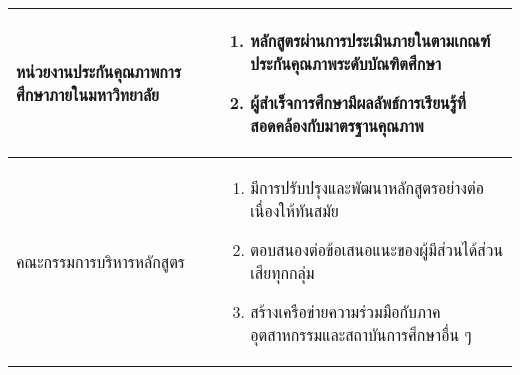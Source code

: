 \begin{longtable}{|p{} | p{}|}
หน่วยงานประกันคุณภาพการศึกษาภายในมหาวิทยาลัย &
\begin{enumerate}
  \item หลักสูตรผ่านการประเมินภายในตามเกณฑ์ประกันคุณภาพระดับบัณฑิตศึกษา
  \item ผู้สำเร็จการศึกษามีผลลัพธ์การเรียนรู้ที่สอดคล้องกับมาตรฐานคุณภาพ
\end{enumerate} \\ \hline

คณะกรรมการบริหารหลักสูตร &
\begin{enumerate}
  \item มีการปรับปรุงและพัฒนาหลักสูตรอย่างต่อเนื่องให้ทันสมัย
  \item ตอบสนองต่อข้อเสนอแนะของผู้มีส่วนได้ส่วนเสียทุกกลุ่ม
  \item สร้างเครือข่ายความร่วมมือกับภาคอุตสาหกรรมและสถาบันการศึกษาอื่น ๆ
\end{enumerate} \\ \hline

\end{longtable}





%
%

